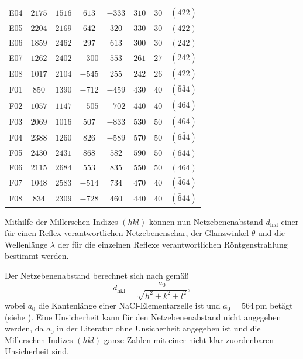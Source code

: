 \begin{table}[H]
\begin{tabular}{c|c|c|c|c|c|c|c}
        E04 & $2175$ & $1516$ & $ 613$ & $-333$ & $310$ & $30$ & $(4\bar{2}2)$ \\
        E05 & $2204$ & $2169$ & $ 642$ & $ 320$ & $330$ & $30$ & $(422)$ \\
        E06 & $1859$ & $2462$ & $ 297$ & $ 613$ & $300$ & $30$ & $(242)$ \\
        E07 & $1262$ & $2402$ & $-300$ & $ 553$ & $261$ & $27$ & $(\bar{2}42)$ \\
        E08 & $1017$ & $2104$ & $-545$ & $ 255$ & $242$ & $26$ & $(\bar{4}22)$ \\
        F01 & $ 850$ & $1390$ & $-712$ & $-459$ & $430$ & $40$ & $(\bar{6}\bar{4}4)$ \\
        F02 & $1057$ & $1147$ & $-505$ & $-702$ & $440$ & $40$ & $(\bar{4}\bar{6}4)$ \\
        F03 & $2069$ & $1016$ & $ 507$ & $-833$ & $530$ & $50$ & $(4\bar{6}4)$ \\
        F04 & $2388$ & $1260$ & $ 826$ & $-589$ & $570$ & $50$ & $(6\bar{4}4)$ \\
        F05 & $2430$ & $2431$ & $ 868$ & $ 582$ & $590$ & $50$ & $(644)$ \\
        F06 & $2115$ & $2684$ & $ 553$ & $ 835$ & $550$ & $50$ & $(464)$ \\
        F07 & $1048$ & $2583$ & $-514$ & $ 734$ & $470$ & $40$ & $(\bar{4}64)$ \\
        F08 & $ 834$ & $2309$ & $-728$ & $ 460$ & $440$ & $40$ & $(\bar{6}44)$                
    \end{tabular}\label{tab:miller2}
\end{table}\newpage
Mithilfe der Millerschen Indizes $(hkl)$ können nun Netzebenenabstand $d_{\mathrm{hkl}}$ einer für einen Reflex verantwortlichen Netzebenenschar, der Glanzwinkel $\theta$
und die Wellenlänge $\lambda$ der für die einzelnen Reflexe verantwortlichen Röntgenstrahlung bestimmt werden.\par
Der Netzebenenabstand berechnet sich nach \cite{laue_handblatt} gemäß
\begin{equation*}
    d_{\mathrm{hkl}} = \frac{a_0}{\sqrt{h^2 + k^2 + l^2}} ,
\end{equation*} wobei $a_0$ die Kantenlänge einer NaCl-Elementarzelle ist und $a_0 = \SI{564}{\pico \meter}$ betägt (siehe \cite{nacl}). Eine Unsicherheit kann
für den Netzebenenabstand nicht angegeben werden, da $a_0$ in der Literatur ohne Unsicherheit angegeben ist und die Millerschen Indizes $(hkl)$ ganze Zahlen
mit einer nicht klar zuordenbaren Unsicherheit sind.\par
